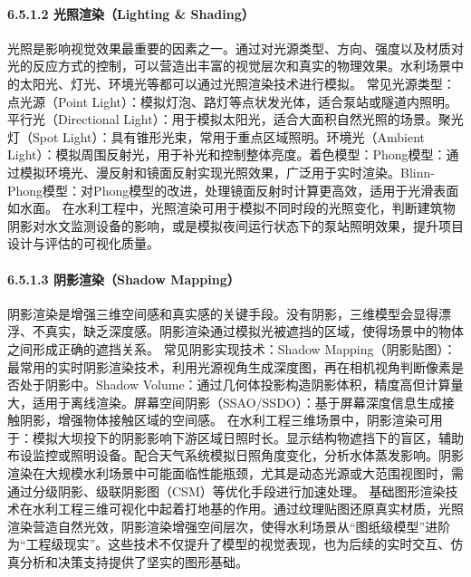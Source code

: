 {\paragraph{6.5.1.2 光照渲染（Lighting \& Shading）}\label{ux5149ux7167ux6e32ux67d3lighting-shading}
光照是影响视觉效果最重要的因素之一。通过对光源类型、方向、强度以及材质对光的反应方式的控制，可以营造出丰富的视觉层次和真实的物理效果。水利场景中的太阳光、灯光、环境光等都可以通过光照渲染技术进行模拟。 常见光源类型：点光源（Point
Light）：模拟灯泡、路灯等点状发光体，适合泵站或隧道内照明。平行光（Directional Light）：用于模拟太阳光，适合大面积自然光照的场景。聚光灯（Spot Light）：具有锥形光束，常用于重点区域照明。环境光（Ambient
Light）：模拟周围反射光，用于补光和控制整体亮度。着色模型：Phong模型：通过模拟环境光、漫反射和镜面反射实现光照效果，广泛用于实时渲染。Blinn-Phong模型：对Phong模型的改进，处理镜面反射时计算更高效，适用于光滑表面如水面。
在水利工程中，光照渲染可用于模拟不同时段的光照变化，判断建筑物阴影对水文监测设备的影响，或是模拟夜间运行状态下的泵站照明效果，提升项目设计与评估的可视化质量。 \paragraph{6.5.1.3 阴影渲染（Shadow
Mapping）}\label{ux9634ux5f71ux6e32ux67d3shadow-mapping}
阴影渲染是增强三维空间感和真实感的关键手段。没有阴影，三维模型会显得漂浮、不真实，缺乏深度感。阴影渲染通过模拟光被遮挡的区域，使得场景中的物体之间形成正确的遮挡关系。 常见阴影实现技术：Shadow
Mapping（阴影贴图）：最常用的实时阴影渲染技术，利用光源视角生成深度图，再在相机视角判断像素是否处于阴影中。Shadow
Volume：通过几何体投影构造阴影体积，精度高但计算量大，适用于离线渲染。屏幕空间阴影（SSAO/SSDO）：基于屏幕深度信息生成接触阴影，增强物体接触区域的空间感。
在水利工程三维场景中，阴影渲染可用于：模拟大坝投下的阴影影响下游区域日照时长。显示结构物遮挡下的盲区，辅助布设监控或照明设备。配合天气系统模拟日照角度变化，分析水体蒸发影响。阴影渲染在大规模水利场景中可能面临性能瓶颈，尤其是动态光源或大范围视图时，需通过分级阴影、级联阴影图（CSM）等优化手段进行加速处理。
基础图形渲染技术在水利工程三维可视化中起着打地基的作用。通过纹理贴图还原真实材质，光照渲染营造自然光效，阴影渲染增强空间层次，使得水利场景从``图纸级模型''进阶为``工程级现实''。这些技术不仅提升了模型的视觉表现，也为后续的实时交互、仿真分析和决策支持提供了坚实的图形基础。
}
